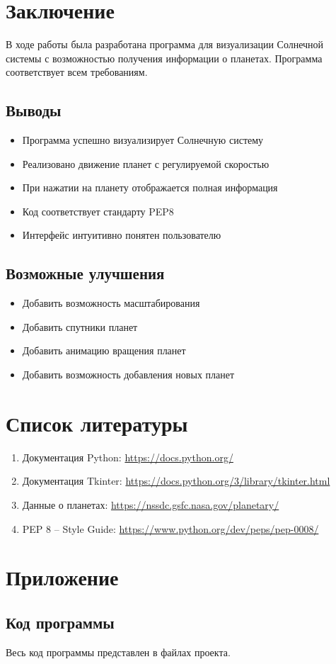 \documentclass[12pt,a4paper]{article}
\begin{document}
\section{Заключение}

В ходе работы была разработана программа для визуализации Солнечной системы с возможностью получения информации о планетах. Программа соответствует всем требованиям.

\subsection{Выводы}
\begin{itemize}
    \item Программа успешно визуализирует Солнечную систему
    \item Реализовано движение планет с регулируемой скоростью
    \item При нажатии на планету отображается полная информация
    \item Код соответствует стандарту PEP8
    \item Интерфейс интуитивно понятен пользователю
\end{itemize}

\subsection{Возможные улучшения}
\begin{itemize}
    \item Добавить возможность масштабирования
    \item Добавить спутники планет
    \item Добавить анимацию вращения планет
    \item Добавить возможность добавления новых планет
\end{itemize}

\section{Список литературы}

\begin{enumerate}
    \item Документация Python: \url{https://docs.python.org/}
    \item Документация Tkinter: \url{https://docs.python.org/3/library/tkinter.html}
    \item Данные о планетах: \url{https://nssdc.gsfc.nasa.gov/planetary/}
    \item PEP 8 -- Style Guide: \url{https://www.python.org/dev/peps/pep-0008/}
\end{enumerate}

\section{Приложение}

\subsection{Код программы}

Весь код программы представлен в файлах проекта.
\end{document}
